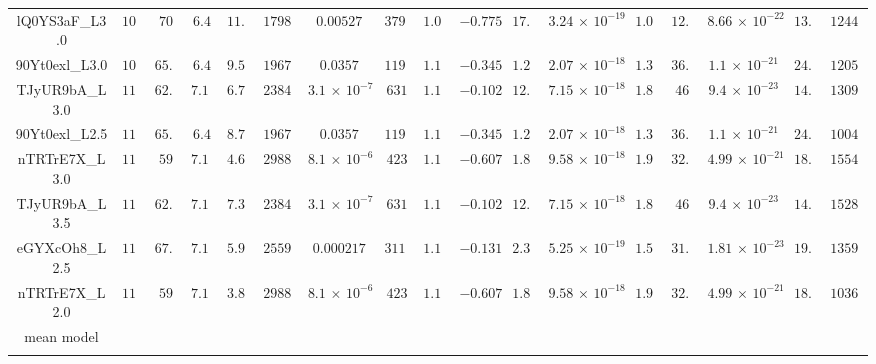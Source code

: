 \begin{appendix}
\begin{table}
\begin{tabular}{ccccccccccccccccc}
lQ0YS3aF\_L3.0 & $ 105$ & $ 70$ & $ 6.4$ & $ 11.6$ & $ 17980$ & $ 0.00527$ & $ 3798$ & $ 1.06$ & $ -0.775$ & $ 17.3$ & $ 3.24\,{\times}\,10^{-19}$ & $ 1.06$ & $ 12.5$ & $ 8.66\,{\times}\,10^{-22}$ & $ 13.5$ & $ 12448$ \\ 
90Yt0exl\_L3.0 & $ 107$ & $ 65.5$ & $ 6.4$ & $ 9.54$ & $ 19670$ & $ 0.0357$ & $ 1191$ & $ 1.13$ & $ -0.345$ & $ 1.25$ & $ 2.07\,{\times}\,10^{-18}$ & $ 1.39$ & $ 36.4$ & $ 1.1\,{\times}\,10^{-21}$ & $ 24.1$ & $ 12051$ \\ 
TJyUR9bA\_L3.0 & $ 110$ & $ 62.6$ & $ 7.11$ & $ 6.77$ & $ 23840$ & $ 3.1\,{\times}\,10^{-7}$ & $ 631$ & $ 1.17$ & $ -0.102$ & $ 12.7$ & $ 7.15\,{\times}\,10^{-18}$ & $ 1.89$ & $ 46$ & $ 9.4\,{\times}\,10^{-23}$ & $ 14.4$ & $ 13097$ \\ 
90Yt0exl\_L2.5 & $ 110$ & $ 65.5$ & $ 6.4$ & $ 8.71$ & $ 19670$ & $ 0.0357$ & $ 1191$ & $ 1.13$ & $ -0.345$ & $ 1.25$ & $ 2.07\,{\times}\,10^{-18}$ & $ 1.39$ & $ 36.4$ & $ 1.1\,{\times}\,10^{-21}$ & $ 24.1$ & $ 10044$ \\ 
nTRTrE7X\_L3.0 & $ 114$ & $ 59$ & $ 7.11$ & $ 4.69$ & $ 29889$ & $ 8.1\,{\times}\,10^{-6}$ & $ 423$ & $ 1.13$ & $ -0.607$ & $ 1.85$ & $ 9.58\,{\times}\,10^{-18}$ & $ 1.94$ & $ 32.7$ & $ 4.99\,{\times}\,10^{-21}$ & $ 18.1$ & $ 15540$ \\ 
TJyUR9bA\_L3.5 & $ 114$ & $ 62.6$ & $ 7.11$ & $ 7.32$ & $ 23840$ & $ 3.1\,{\times}\,10^{-7}$ & $ 631$ & $ 1.17$ & $ -0.102$ & $ 12.7$ & $ 7.15\,{\times}\,10^{-18}$ & $ 1.89$ & $ 46$ & $ 9.4\,{\times}\,10^{-23}$ & $ 14.4$ & $ 15281$ \\ 
eGYXcOh8\_L2.5 & $ 116$ & $ 67.6$ & $ 7.11$ & $ 5.99$ & $ 25590$ & $ 0.000217$ & $ 3110$ & $ 1.18$ & $ -0.131$ & $ 2.34$ & $ 5.25\,{\times}\,10^{-19}$ & $ 1.56$ & $ 31.5$ & $ 1.81\,{\times}\,10^{-23}$ & $ 19.3$ & $ 13591$ \\ 
nTRTrE7X\_L2.0 & $ 118$ & $ 59$ & $ 7.11$ & $ 3.83$ & $ 29889$ & $ 8.1\,{\times}\,10^{-6}$ & $ 423$ & $ 1.13$ & $ -0.607$ & $ 1.85$ & $ 9.58\,{\times}\,10^{-18}$ & $ 1.94$ & $ 32.7$ & $ 4.99\,{\times}\,10^{-21}$ & $ 18.1$ & $ 10362$ \\ 
\noalign{\smallskip} 
\hline 
mean model \\
\noalign{\smallskip} 
\hline 
\noalign{\smallskip} 

\end{tabular}
\end{table}
\end{appendix}
